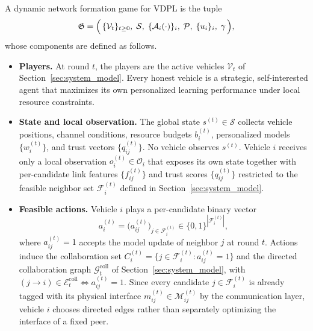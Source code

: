 \begin{definition}
\label{def:game}
A dynamic network formation game for VDPL is the tuple
\begin{equation*}
    \mathfrak{G} = \Bigl(\,\{\mathcal{V}_t\}_{t\ge 0},\;\mathcal{S},\;\{\mathcal{A}_i(\cdot)\}_i,\;\mathcal{P},\;\{u_i\}_i,\;\gamma\,\Bigr),
\end{equation*}
whose components are defined as follows.
\begin{itemize}
    \item \textbf{Players.} At round $t$, the players are the active vehicles $\mathcal{V}_t$ of Section~\ref{sec:system_model}. Every honest vehicle is a strategic, self-interested agent that maximizes its own personalized learning performance under local resource constraints.

    \item \textbf{State and local observation.} The global state $s^{(t)}\in\mathcal{S}$ collects vehicle positions, channel conditions, resource budgets $b_i^{(t)}$, personalized models $\{w_i^{(t)}\}$, and trust vectors $\{q_{ij}^{(t)}\}$. No vehicle observes $s^{(t)}$. Vehicle $i$ receives only a local observation $o_i^{(t)}\in\mathcal{O}_i$ that exposes its own state together with per-candidate link features $\{f_{ij}^{(t)}\}$ and trust scores $\{q_{ij}^{(t)}\}$ restricted to the feasible neighbor set $\mathcal{F}_i^{(t)}$ defined in Section~\ref{sec:system_model}.

    \item \textbf{Feasible actions.} Vehicle $i$ plays a per-candidate binary vector
    \begin{equation*}
        a_i^{(t)} = \bigl(a_{ij}^{(t)}\bigr)_{j\in\mathcal{F}_i^{(t)}}\in\{0,1\}^{|\mathcal{F}_i^{(t)}|},
    \end{equation*}
    where $a_{ij}^{(t)}=1$ accepts the model update of neighbor $j$ at round $t$. Actions induce the collaboration set $C_i^{(t)}=\{j\in\mathcal{F}_i^{(t)}:a_{ij}^{(t)}=1\}$ and the directed collaboration graph $\mathcal{G}_t^{\mathrm{coll}}$ of Section~\ref{sec:system_model}, with $(j\!\to\! i)\in\mathcal{E}_t^{\mathrm{coll}}\iff a_{ij}^{(t)}=1$. Since every candidate $j\in\mathcal{F}_i^{(t)}$ is already tagged with its physical interface $m_{ij}^{(t)}\in\mathcal{M}_{ij}^{(t)}$ by the communication layer, vehicle $i$ chooses directed edges rather than separately optimizing the interface of a fixed peer.


\end{itemize}
\end{definition}
